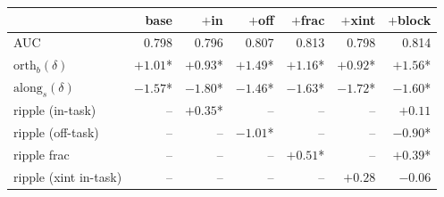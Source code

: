 \begin{table}[t]
\begin{tabular}{l r r r r r r}
\toprule
 & base & $+$in & $+$off & $+$frac & $+$xint & $+$block \\
\midrule
AUC & 0.798 & 0.796 & 0.807 & 0.813 & 0.798 & 0.814 \\
$\mathrm{orth}_b(\delta)$ & $+1.01$* & $+0.93$* & $+1.49$* & $+1.16$* & $+0.92$* & $+1.56$* \\
$\mathrm{along}_s(\delta)$ & $-1.57$* & $-1.80$* & $-1.46$* & $-1.63$* & $-1.72$* & $-1.60$* \\
ripple (in-task) & -- & $+0.35$* & -- & -- & -- & $+0.11$ \\
ripple (off-task) & -- & -- & $-1.01$* & -- & -- & $-0.90$* \\
ripple frac & -- & -- & -- & $+0.51$* & -- & $+0.39$* \\
ripple (xint in-task) & -- & -- & -- & -- & $+0.28$ & $-0.06$ \\
\bottomrule
\end{tabular}

\end{table}
